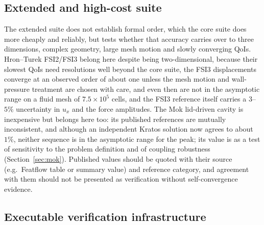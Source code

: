 \subsection{Extended and high-cost suite}\label{sec:extended_suite}

The extended suite does not establish formal order, which the core suite does more cheaply and reliably, but tests whether that accuracy carries over to three dimensions, complex geometry, large mesh motion and slowly converging QoIs.
Hron--Turek FSI2/FSI3 belong here despite being two-dimensional, because their slowest QoIs need resolutions well beyond the core suite, the FSI3 displacements converge at an observed order of about one unless the mesh motion and wall-pressure treatment are chosen with care, and even then are not in the asymptotic range on a fluid mesh of $7.5\times10^5$ cells, and the FSI3 reference itself carries a $3$--$5\%$ uncertainty in $u_x$ and the force amplitudes.
The Mok lid-driven cavity is inexpensive but belongs here too: its published references are mutually inconsistent, and although an independent Kratos solution now agrees to about $1\%$, neither sequence is in the asymptotic range for the peak; its value is as a test of sensitivity to the problem definition and of coupling robustness (Section~\ref{sec:mok}).
Published values should be quoted with their source (e.g.\ Featflow table or summary value) and reference category, and agreement with them should not be presented as verification without self-convergence evidence.


\subsection{Executable verification infrastructure}\label{sec:infrastructure}

